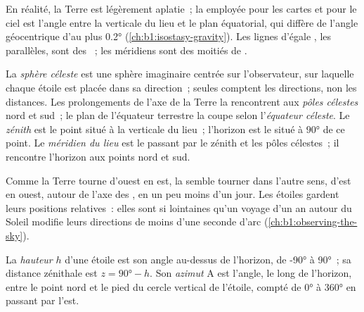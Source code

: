 En réalité, la Terre est légèrement aplatie~; la  employée pour les
cartes et pour le ciel est l'angle entre la verticale du lieu et le plan
équatorial, qui diffère de l'angle géocentrique d'au plus \ang{0.2}
(\cref{ch:b1:isostasy-gravity}). Les lignes d'égale , les parallèles,
sont des ~; les méridiens sont des moitiés de .

\begin{definition}\label{def:b1:spherical-astronomy:celestial-sphere}
La \emph{sphère céleste} est une sphère
imaginaire centrée sur l'observateur, sur laquelle chaque étoile est placée
dans sa direction~; seules comptent les directions, non les distances. Les
prolongements de l'axe de la Terre la rencontrent aux \emph{pôles
célestes} nord et sud~; le plan de
l'équateur terrestre la coupe selon l'\emph{équateur
céleste}. Le \emph{zénith}
est le point situé à la verticale du lieu~; l'horizon est le  situé à $\ang{90}$ de ce point. Le \emph{méridien du
lieu} est le  passant par le zénith et les pôles
célestes~; il rencontre l'horizon aux points nord et sud.
\end{definition}

Comme la Terre tourne d'ouest en est, la  semble tourner dans
l'autre sens, d'est en ouest, autour de l'axe des , en un peu
moins d'un jour. Les étoiles gardent leurs positions relatives~: elles sont si
lointaines qu'un voyage d'un an autour du Soleil modifie leurs directions de
moins d'une seconde d'arc (\cref{ch:b1:observing-the-sky}).

\begin{definition}\label{def:b1:spherical-astronomy:horizontal}
La \emph{hauteur} $h$ d'une étoile est son angle
au-dessus de l'horizon, de \ang{-90} à \ang{90}~; sa distance zénithale est
$z = \ang{90} - h$. Son \emph{azimut} $\mathrm{A}$ est
l'angle, le long de l'horizon, entre le point nord et le pied du cercle
vertical de l'étoile, compté de \ang{0} à \ang{360} en passant par l'est.
\end{definition}

